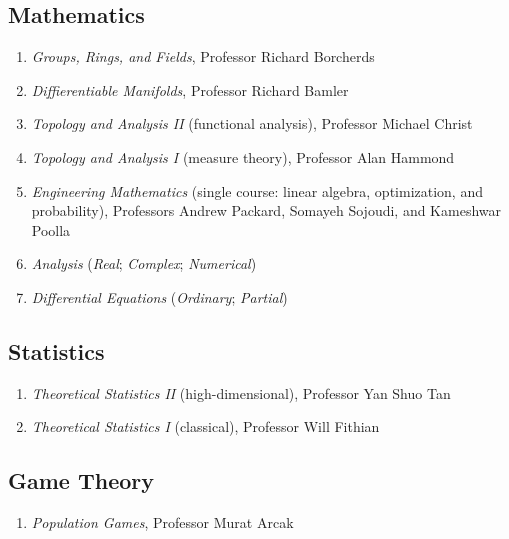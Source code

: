 \documentclass[11pt]{article}
\newcommand{\subsectionskip}{\baselineskip}	%
\begin{document}
\begin{coursework}
		\vspace*{\subsectionskip}
		
		\subsection{Mathematics}
		\begin{enumerate}[label=\arabic*.]
			\item \textit{Groups, Rings, and Fields}, Professor Richard Borcherds
			\item \textit{Diffierentiable Manifolds}, Professor Richard Bamler
			\item \textit{Topology and Analysis II} (functional analysis), Professor Michael Christ
			\item \textit{Topology and Analysis I} (measure theory), Professor Alan Hammond
			\item \textit{Engineering Mathematics} (single course: linear algebra, optimization, and probability), Professors Andrew Packard, Somayeh Sojoudi, and Kameshwar Poolla
			\item \textit{Analysis} (\textit{Real}; \textit{Complex}; \textit{Numerical})
			\item \textit{Differential Equations} (\textit{Ordinary}; \textit{Partial})
		\end{enumerate}
		
		\vspace*{\subsectionskip}

		\subsection{Statistics}
		\begin{enumerate}[label=\arabic*.]
			\item \textit{Theoretical Statistics II} (high-dimensional), Professor Yan Shuo Tan
			\item \textit{Theoretical Statistics I} (classical), Professor Will Fithian
		\end{enumerate}

		\vspace*{\subsectionskip}

		\subsection{Game Theory}
		\begin{enumerate}[label=\arabic*.]
			\item \textit{Population Games}, Professor Murat Arcak
		\end{enumerate}
	\end{coursework}
\end{document}
